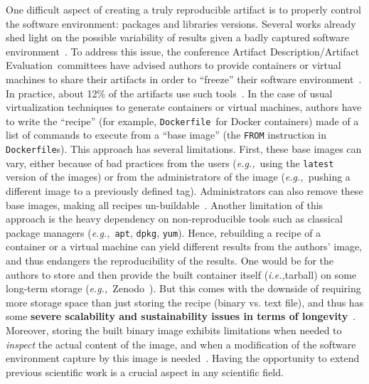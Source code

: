 \documentclass[sigconf,natbib=false]{acmart}
\newcommand{\ie}{\emph{i.e.,}}
\newcommand{\eg}{\emph{e.g.,}}
\newcommand{\ad}{Artifact Description}
\newcommand{\aeval}{Artifact Evaluation}
\newcommand{\adae}{\ad/\aeval}
\newcommand{\df}{\texttt{Dockerfile}}
\newcommand{\todo}[1]{{\color{red}{TODO: #1}}}
\begin{document}
One difficult aspect of creating a truly reproducible artifact is to properly control the software environment: packages and libraries versions.
Several works already shed light on the possible variability of results given a badly captured software environment~\cite{mytkowicz_producing_nodate, sokolowski2024impact}.
To address this issue, the conference \adae\ committees have advised authors to provide containers or virtual machines to share their artifacts in order to ``freeze'' their software environment~\cite{eurosys25, aetips, csartifacts}.
In practice, about 12\% of the artifacts use such tools~\cite{guilloteau2024longevity}.
In the case of usual virtualization techniques to generate containers or virtual machines, authors have to write the ``recipe'' (for example, \df\ for Docker containers) made of a list of commands to execute from a ``base image'' (the \texttt{FROM} instruction in \df s).
This approach has several limitations.
First, these base images can vary, either because of bad practices from the users (\eg\ using the \texttt{latest} version of the images) or from the administrators of the image (\eg\ pushing a different image to a previously defined tag).
Administrators can also remove these base images, making all recipes un-buildable~\cite{nvidia_cuda_lifetime}.
Another limitation of this approach is the heavy dependency on non-reproducible tools such as classical package managers (\eg\ \texttt{apt}, \texttt{dpkg}, \texttt{yum}).
Hence, rebuilding a recipe of a container or a virtual machine can yield different results from the authors' image, and thus endangers the reproducibility of the results.
One would be for the authors to store and then provide the built container itself (\ie tarball) on some long-term storage (\eg\ Zenodo~\cite{zenodo}).
But this comes with the downside of requiring more storage space than just storing the recipe (binary vs. text file), and thus has some \textbf{severe scalability and sustainability issues in terms of longevity}~\cite{monroe2023preservation, guilloteau2024longevity}.
Moreover, storing the built binary image exhibits limitations when needed to \emph{inspect} the actual content of the image, and when a modification of the software environment capture by this image is needed~\cite{mercier2018considering}.
Having the opportunity to extend previous scientific work is a crucial aspect in any scientific field.


\end{document}
